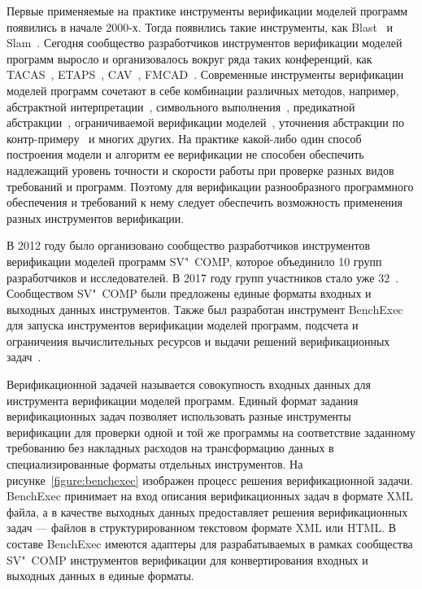 Первые применяемые на практике инструменты верификации моделей программ появились в начале 2000-х.
Тогда появились такие инструменты, как Blast~\cite{Henzinger:2003:SVB} и Slam~\cite{Ball2004}.
Сегодня сообщество разработчиков инструментов верификации моделей программ выросло и организовалось вокруг ряда таких конференций, как TACAS~\cite{tacas}, ETAPS~\cite{etaps}, CAV~\cite{cav}, FMCAD~\cite{fmcad}.
Современные инструменты верификации моделей программ сочетают в себе комбинации различных методов, например, абстрактной интерпретации~\cite{Cousot:1977:AIU}, символьного выполнения~\cite{Boyer:1975:SFS}, предикатной абстракции~\cite{Graf:1997:CAS}, ограничиваемой верификации моделей~\cite{Biere03boundedmodel}, уточнения абстракции по контр-примеру~\cite{Clarke:2003:CAR} и многих других.
На практике какой-либо один способ построения модели и алгоритм ее верификации не способен обеспечить надлежащий уровень точности и скорости работы при проверке разных видов требований и программ.
Поэтому для верификации разнообразного программного обеспечения и требований к нему следует обеспечить возможность применения разных инструментов верификации.

В 2012 году было организовано сообщество разработчиков инструментов верификации моделей программ SV"~COMP, которое объединило 10 групп разработчиков и исследователей.
В 2017 году групп участников стало уже 32~\cite{Beyer:2017:SVV}. 
Сообществом SV"~COMP были предложены единые форматы входных и выходных данных инструментов.
Также был разработан инструмент BenchExec для запуска инструментов верификации моделей программ, подсчета и ограничения вычислительных ресурсов и выдачи решений верификационных задач~\cite{Beyer2015}.

Верификационной задачей называется совокупность входных данных для инструмента верификации моделей программ.
Единый формат задания верификационных задач позволяет использовать разные инструменты верификации для проверки одной и той же программы на соответствие заданному требованию без накладных расходов на трансформацию данных в специализированные форматы отдельных инструментов.
На рисунке~\ref{figure:benchexec} изображен процесс решения верификационной задачи.
BenchExec принимает на вход описания верификационных задач в формате XML файла, а в качестве выходных данных предоставляет решения верификационных задач --- файлов в структурированном текстовом формате XML или HTML.
В составе BenchExec имеются адаптеры для разрабатываемых в рамках сообщества SV"~COMP инструментов верификации для конвертирования входных и выходных данных в единые форматы.

